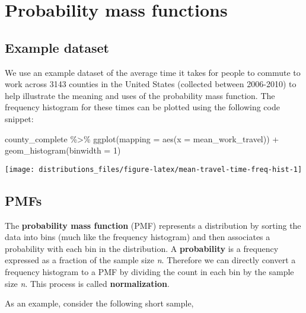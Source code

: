 \documentclass[
]{book}
\newenvironment{Shaded}{\begin{snugshade}}{\end{snugshade}}
\newcommand{\AttributeTok}[1]{\textcolor[rgb]{0.77,0.63,0.00}{#1}}
\newcommand{\DecValTok}[1]{\textcolor[rgb]{0.00,0.00,0.81}{#1}}
\newcommand{\FunctionTok}[1]{\textcolor[rgb]{0.00,0.00,0.00}{#1}}
\newcommand{\NormalTok}[1]{#1}
\newcommand{\SpecialCharTok}[1]{\textcolor[rgb]{0.00,0.00,0.00}{#1}}
\begin{document}
\hypertarget{probability-mass-functions}{%
\section{Probability mass functions}\label{probability-mass-functions}}

\hypertarget{example-dataset}{%
\subsection{Example dataset}\label{example-dataset}}

We use an example dataset of the average time it takes for people to commute to work across 3143 counties in the United States (collected between 2006-2010) to help illustrate the meaning and uses of the probability mass function.
The frequency histogram for these times can be plotted using the following code snippet:

\begin{Shaded}
\begin{Highlighting}[]
\NormalTok{county\_complete }\SpecialCharTok{\%\textgreater{}\%}
  \FunctionTok{ggplot}\NormalTok{(}\AttributeTok{mapping =} \FunctionTok{aes}\NormalTok{(}\AttributeTok{x =}\NormalTok{ mean\_work\_travel)) }\SpecialCharTok{+}
  \FunctionTok{geom\_histogram}\NormalTok{(}\AttributeTok{binwidth =} \DecValTok{1}\NormalTok{)}
\end{Highlighting}
\end{Shaded}

\begin{center}\texttt{[image: distributions\_files/figure-latex/mean-travel-time-freq-hist-1]} \end{center}

\hypertarget{pmfs}{%
\subsection{PMFs}\label{pmfs}}

The \textbf{probability mass function} (PMF) represents a distribution by sorting the data into bins (much like the frequency histogram) and then associates a probability with each bin in the distribution.
A \textbf{probability} is a frequency expressed as a fraction of the sample size \emph{n}.
Therefore we can directly convert a frequency histogram to a PMF by dividing the count in each bin by the sample size \emph{n}.
This process is called \textbf{normalization}.

As an example, consider the following short sample,
\end{document}
